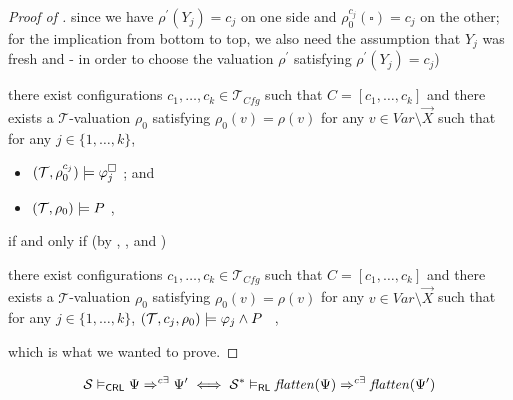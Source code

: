 \begin{proof}[Proof of ]
    since we have $\rho^\prime(Y_j) = c_j$
    on one side and $\rho_0^{c_j}(\square) = c_j$ on the other; for the implication from bottom to top,
    we also need the assumption that $Y_j$ was fresh and  -
    in order to choose the valuation $\rho^\prime$ satisfying $\rho^\prime(Y_j) = c_j$)
    \begin{proofenv}
        there exist configurations $c_1, \ldots, c_k \in \mathcal{T}_{\mathit{Cfg}}$ such that
        $C = [c_1, \ldots, c_k]$ and there exists a $\mathcal{T}$-valuation $\rho_0$
        satisfying $\rho_0(v) = \rho(v)$ for any $v \in \mathit{Var} \setminus \vec{X}$
        such that for any $j \in \{ 1, \ldots, k \}$,
        \begin{itemize}
            \item $(\mathcal{T}, \rho_0^{c_j}) \models \varphi_j^{\square}$ ; and
            \item $(\mathcal{T}, \rho_0) \models P$ ,
        \end{itemize}
    \end{proofenv}
    if and only if (by , , and )
    \begin{proofenv}
        there exist configurations $c_1, \ldots, c_k \in \mathcal{T}_{\mathit{Cfg}}$ such that
        $C = [c_1, \ldots, c_k]$ and there exists a $\mathcal{T}$-valuation $\rho_0$
        satisfying $\rho_0(v) = \rho(v)$ for any $v \in \mathit{Var} \setminus \vec{X}$
        such that for any $j \in \{ 1, \ldots, k \}$,
        $(\mathcal{T}, c_j, \rho_0) \models \varphi_j \land P$ \, ,
    \end{proofenv}
    which is what we wanted to prove.
\end{proof}


\begin{lemma}\label{thm:correspondence}
\begin{equation*}
\mathcal{S} \vDash_{\mathsf{CRL}} \Psi \Rightarrow^{c\exists} \Psi^\prime
  \iff \mathcal{S}^* \vDash_{\mathsf{RL}} \mathit{flatten}(\Psi) \Rightarrow^{c\exists} \mathit{flatten}(\Psi^\prime)
\end{equation*}
\end{lemma}

